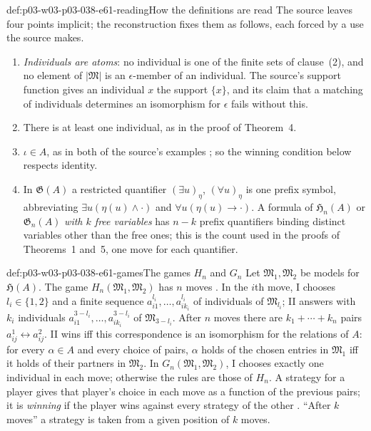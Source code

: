 \begin{hbconvention}{def:p03-w03-p03-038-e61-reading}{How the definitions are read}
The source leaves four points implicit; the reconstruction fixes them as
follows, each forced by a use the source makes.
\begin{enumerate}
\item \emph{Individuals are atoms}: no individual is one of the finite sets
      of clause~(2), and no element of \(|\mathfrak M|\) is an
      \(\epsilon\)-member of an individual. The source's support function
      gives an individual \(x\) the support \(\{x\}\), and its claim that a
      matching of individuals determines an isomorphism for \(\epsilon\)
      fails without this.
\item There is at least one individual, as in the proof of Theorem~4.
\item \(\iota\in A\), as in both of the source's examples
      \cite[pp.~131, 134]{Ehrenfeucht1961}; so the winning condition below
      respects identity.
\item In \(\mathfrak G(A)\) a restricted quantifier \((\exists u)_\eta\),
      \((\forall u)_\eta\) is one prefix symbol, abbreviating
      \(\exists u(\eta(u)\wedge\cdot)\) and \(\forall u(\eta(u)\to\cdot)\).
      A formula of \(\mathfrak H_n(A)\) or \(\mathfrak G_n(A)\) \emph{with
      \(k\) free variables} has \(n-k\) prefix quantifiers binding distinct
      variables other than the free ones; this is the count used in the
      proofs of Theorems~1 and~5, one move for each quantifier.
\end{enumerate}
\end{hbconvention}

\begin{hbdefinition}{def:p03-w03-p03-038-e61-games}{The games \(H_n\) and \(G_n\)}
Let \(\mathfrak M_1,\mathfrak M_2\) be models for \(\mathfrak H(A)\). The
game \(H_n(\mathfrak M_1,\mathfrak M_2)\) has \(n\) moves
\cite[\S I.2, p.~130]{Ehrenfeucht1961}. In the \(i\)th move, I chooses
\(l_i\in\{1,2\}\) and a finite sequence
\(a^{l_i}_{i1},\ldots,a^{l_i}_{ik_i}\) of individuals of
\(\mathfrak M_{l_i}\); II answers with \(k_i\) individuals
\(a^{3-l_i}_{i1},\ldots,a^{3-l_i}_{ik_i}\) of \(\mathfrak M_{3-l_i}\). After
\(n\) moves there are \(k_1+\cdots+k_n\) pairs
\(a^1_{ij}\leftrightarrow a^2_{ij}\). II wins iff this correspondence is an
isomorphism for the relations of \(A\): for every \(\alpha\in A\) and every
choice of pairs, \(\alpha\) holds of the chosen entries in \(\mathfrak M_1\)
iff it holds of their partners in \(\mathfrak M_2\). In
\(G_n(\mathfrak M_1,\mathfrak M_2)\), I chooses exactly one individual in
each move; otherwise the rules are those of \(H_n\). A strategy for a player
gives that player's choice in each move as a function of the previous pairs;
it is \emph{winning} if the player wins against every strategy of the other
\cite[pp.~131--132]{Ehrenfeucht1961}. ``After \(k\) moves'' a strategy is
taken from a given position of \(k\) moves.
\end{hbdefinition}

